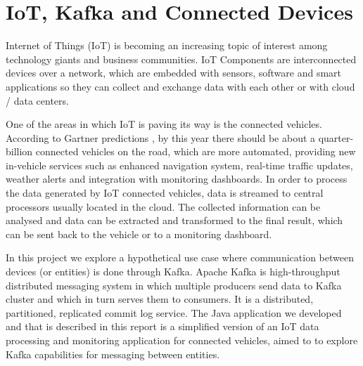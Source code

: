 \documentclass[12pt]{article}
\begin{document}


\newpage
\section{IoT, Kafka and Connected Devices} %

Internet of Things (IoT) is becoming an increasing topic of interest among technology giants and business communities.
IoT Components are interconnected devices over a network, which are embedded with sensors, software and smart applications so they can collect and exchange data 
with each other or with cloud / data centers.

One of the areas in which IoT is paving its way is the connected vehicles. 
According to Gartner predictions \cite{gartner}, by this year there should be about a quarter-billion connected vehicles on the road, which are more automated, 
providing new in-vehicle services such as enhanced navigation system, real-time traffic updates, weather alerts and integration with monitoring dashboards. 
In order to process the data generated by IoT connected vehicles, data is streamed to central processors usually located in the cloud. 
The collected information can be analysed and data can be extracted and transformed to the final result, which can be sent back to the vehicle or to a monitoring dashboard. 

In this project we explore a hypothetical use case where communication between devices (or entities) is done through Kafka.
Apache Kafka \cite{kafka} is high-throughput distributed messaging system in which multiple producers send data to Kafka cluster and which in turn serves them to consumers. 
It is a distributed, partitioned, replicated commit log service.
The Java application we developed and that is described in this report is a simplified version of an IoT data processing and monitoring application for connected
vehicles, aimed to to explore Kafka capabilities for messaging between entities.
\end{document}
